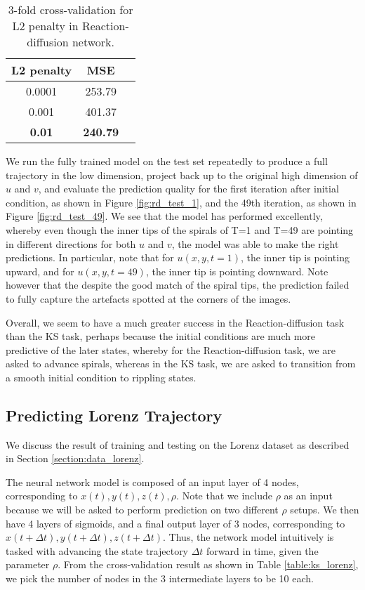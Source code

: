 \documentclass[letterpaper, 10 pt, conference]{ieeeconf}  %
\begin{document}
\begin{table}[ht]
\caption{3-fold cross-validation for L2 penalty in Reaction-diffusion network.} %
\centering %
\begin{tabular}{c c c} 
\hline\hline 
L2 penalty & MSE \\
\hline
0.0001 & 253.79 \\
0.001 & 401.37 \\
\textbf{0.01} & \textbf{240.79} \\
\end{tabular}
\label{table:rd_cv} %
\end{table}

We run the fully trained model on the test set repeatedly to produce a full trajectory in the low dimension, project back up to the original high dimension of $u$ and $v$, and evaluate the prediction quality for the first iteration after initial condition, as shown in Figure \ref{fig:rd_test_1}, and the 49th iteration, as shown in Figure \ref{fig:rd_test_49}. We see that the model has performed excellently, whereby even though the inner tips of the spirals of T=1 and T=49 are pointing in different directions for both $u$ and $v$, the model was able to make the right predictions. In particular, note that for $u(x,y, t=1)$, the inner tip is pointing upward, and for $u(x,y, t = 49)$, the inner tip is pointing downward. Note however that the despite the good match of the spiral tips, the prediction failed to fully capture the artefacts spotted at the corners of the images.

Overall, we seem to have a much greater success in the Reaction-diffusion task than the KS task, perhaps because the initial conditions are much more predictive of the later states, whereby for the Reaction-diffusion task, we are asked to advance spirals, whereas in the KS task, we are asked to transition from a smooth initial condition to rippling states.

\subsection{Predicting Lorenz Trajectory}
We discuss the result of training and testing on the Lorenz dataset as described in Section \ref{section:data_lorenz}.

The neural network model is composed of an input layer of 4 nodes, corresponding to $x(t), y(t), z(t), \rho$. Note that we include $\rho$ as an input because we will be asked to perform prediction on two different $\rho$ setups. We then have 4 layers of sigmoids, and a final output layer of 3 nodes, corresponding to $x(t+\Delta t), y(t+\Delta t), z(t+\Delta t)$. Thus, the network model intuitively is tasked with advancing the state trajectory $\Delta t$ forward in time, given the parameter $\rho$. From the cross-validation result as shown in Table \ref{table:ks_lorenz}, we pick the number of nodes in the 3 intermediate layers to be 10 each.
\end{document}
